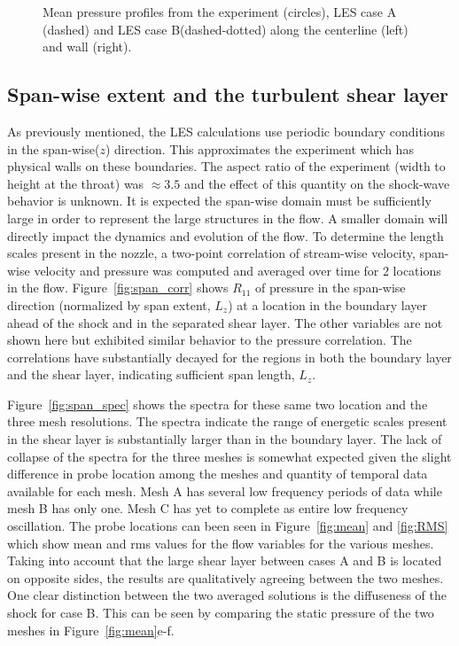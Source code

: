 \documentclass[]{aiaa-tc}%
\begin{document}
\begin{figure}[!ht]
	\caption{ Mean pressure profiles from the experiment (circles),  LES case A (dashed) and LES case B(dashed-dotted) along the centerline (left) and wall (right). 
	\label{fig:P_prof}
	}
\end{figure}


\subsection{Span-wise extent and the turbulent shear layer }
As previously mentioned, the LES calculations use periodic boundary conditions in the span-wise($z$) direction.  This approximates the experiment which has physical walls on these boundaries.  The aspect ratio of the experiment (width to height at the throat) was $\approx 3.5$ and the effect of this quantity on the shock-wave behavior is unknown.  It is expected the span-wise domain must be sufficiently large in order to represent the large structures in the flow.  A smaller domain will directly impact the dynamics and evolution of the flow.  To determine the length scales present in the nozzle, a two-point correlation of stream-wise velocity, span-wise velocity and pressure was computed and averaged over time for 2 locations in the flow.  Figure~\ref{fig:span_corr} shows $R_{11}$ of pressure in the span-wise direction (normalized by span extent, $L_z$) at a location in the boundary layer ahead of the shock and in the separated shear layer.  The other variables are not shown here but exhibited similar behavior to the pressure correlation.  The correlations have substantially decayed for the regions in both the boundary layer and the shear layer, indicating sufficient span length, $L_z$.  

Figure~\ref{fig:span_spec} shows the spectra for these same two location and the three mesh resolutions.  The spectra indicate the range of energetic scales present in the shear layer is substantially larger than in the boundary layer.  The lack of collapse of the spectra for the three meshes is somewhat expected given the slight difference in probe location among the meshes and quantity of temporal data available for each mesh.  Mesh A has several low frequency periods of data while mesh B has only one.  Mesh C has yet to complete as entire low frequency oscillation.  The probe locations can been seen in Figure~\ref{fig:mean} and \ref{fig:RMS} which show mean and rms values for the flow variables for the various meshes.  Taking into account that the large shear layer between cases A and B is located on opposite sides, the results are qualitatively agreeing between the two meshes.  One clear distinction between the two averaged solutions is the diffuseness of the shock for case B.  This can be seen by comparing the static pressure of the two meshes in Figure~\ref{fig:mean}e-f.
\end{document}
